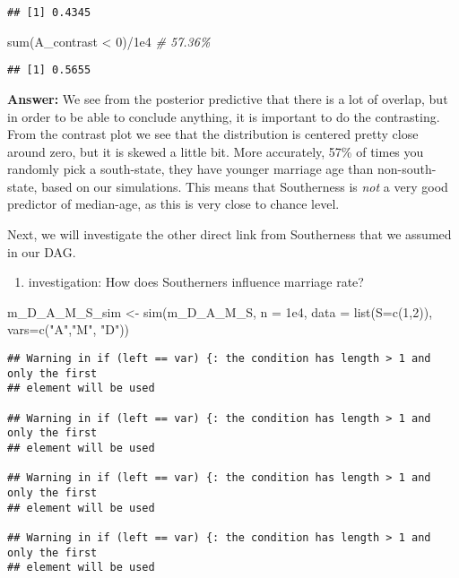 \documentclass[
]{article}
\newenvironment{Shaded}{\begin{snugshade}}{\end{snugshade}}
\newcommand{\AttributeTok}[1]{\textcolor[rgb]{0.77,0.63,0.00}{#1}}
\newcommand{\CommentTok}[1]{\textcolor[rgb]{0.56,0.35,0.01}{\textit{#1}}}
\newcommand{\DecValTok}[1]{\textcolor[rgb]{0.00,0.00,0.81}{#1}}
\newcommand{\FloatTok}[1]{\textcolor[rgb]{0.00,0.00,0.81}{#1}}
\newcommand{\FunctionTok}[1]{\textcolor[rgb]{0.00,0.00,0.00}{#1}}
\newcommand{\NormalTok}[1]{#1}
\newcommand{\OtherTok}[1]{\textcolor[rgb]{0.56,0.35,0.01}{#1}}
\newcommand{\SpecialCharTok}[1]{\textcolor[rgb]{0.00,0.00,0.00}{#1}}
\newcommand{\StringTok}[1]{\textcolor[rgb]{0.31,0.60,0.02}{#1}}
\providecommand{\tightlist}{%
  \setlength{\itemsep}{0pt}\setlength{\parskip}{0pt}}
\begin{document}
\begin{verbatim}
## [1] 0.4345
\end{verbatim}

\begin{Shaded}
\begin{Highlighting}[]
\FunctionTok{sum}\NormalTok{(A\_contrast }\SpecialCharTok{\textless{}} \DecValTok{0}\NormalTok{)}\SpecialCharTok{/}\FloatTok{1e4} \CommentTok{\# 57.36\%}
\end{Highlighting}
\end{Shaded}

\begin{verbatim}
## [1] 0.5655
\end{verbatim}

\textbf{Answer:} We see from the posterior predictive that there is a
lot of overlap, but in order to be able to conclude anything, it is
important to do the contrasting. From the contrast plot we see that the
distribution is centered pretty close around zero, but it is skewed a
little bit. More accurately, 57\% of times you randomly pick a
south-state, they have younger marriage age than non-south-state, based
on our simulations. This means that Southerness is \emph{not} a very
good predictor of median-age, as this is very close to chance level.

Next, we will investigate the other direct link from Southerness that we
assumed in our DAG.

\begin{enumerate}
\def\labelenumi{\arabic{enumi}.}
\setcounter{enumi}{1}
\tightlist
\item
  investigation: How does Southerners influence marriage rate?
\end{enumerate}

\begin{Shaded}
\begin{Highlighting}[]
\NormalTok{m\_D\_A\_M\_S\_sim }\OtherTok{\textless{}{-}} \FunctionTok{sim}\NormalTok{(m\_D\_A\_M\_S,}
             \AttributeTok{n =} \FloatTok{1e4}\NormalTok{,}
             \AttributeTok{data =} \FunctionTok{list}\NormalTok{(}\AttributeTok{S=}\FunctionTok{c}\NormalTok{(}\DecValTok{1}\NormalTok{,}\DecValTok{2}\NormalTok{)),}
             \AttributeTok{vars=}\FunctionTok{c}\NormalTok{(}\StringTok{"A"}\NormalTok{,}\StringTok{"M"}\NormalTok{, }\StringTok{"D"}\NormalTok{))}
\end{Highlighting}
\end{Shaded}

\begin{verbatim}
## Warning in if (left == var) {: the condition has length > 1 and only the first
## element will be used

## Warning in if (left == var) {: the condition has length > 1 and only the first
## element will be used

## Warning in if (left == var) {: the condition has length > 1 and only the first
## element will be used

## Warning in if (left == var) {: the condition has length > 1 and only the first
## element will be used
\end{verbatim}
\end{document}
